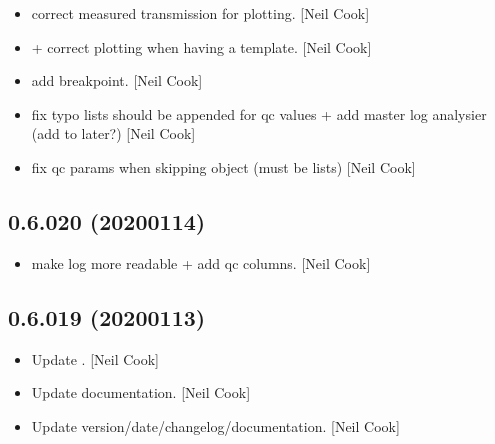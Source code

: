 \documentclass[a4paper,10pt,english]{report}
\begin{document}
\begin{itemize}
\item {} 
 \sphinxhyphen{} correct measured transmission for
plotting. {[}Neil Cook{]}

\item {} 
 +  \sphinxhyphen{} correct
plotting when having a template. {[}Neil Cook{]}

\item {} 
 \sphinxhyphen{} add breakpoint. {[}Neil Cook{]}

\item {} 
 \sphinxhyphen{} fix typo lists should be appended for qc values
+ add master log analysier (add to  later?) {[}Neil Cook{]}

\item {} 
 \sphinxhyphen{} fix qc params when skipping
object (must be lists) {[}Neil Cook{]}

\end{itemize}


\subsection{0.6.020 (2020\sphinxhyphen{}01\sphinxhyphen{}14)}
\label{\detokenize{misc/changelog:id18}}\begin{itemize}
\item {} 
 \sphinxhyphen{} make log more readable + add qc  columns. {[}Neil
Cook{]}

\end{itemize}


\subsection{0.6.019 (2020\sphinxhyphen{}01\sphinxhyphen{}13)}
\label{\detokenize{misc/changelog:id19}}\begin{itemize}
\item {} 
Update . {[}Neil Cook{]}

\item {} 
Update documentation. {[}Neil Cook{]}

\item {} 
Update version/date/changelog/documentation. {[}Neil Cook{]}

\end{itemize}
\end{document}
